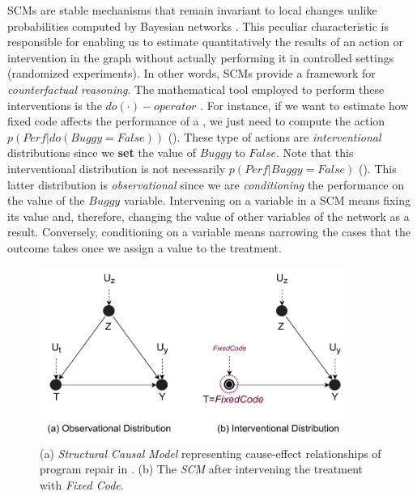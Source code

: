 SCMs are stable mechanisms that remain invariant to local changes unlike probabilities computed by Bayesian networks \citep{Pearl2016Causality}. This peculiar characteristic is responsible for enabling us to estimate quantitatively the results of an action or intervention in the graph without actually performing it in controlled settings (\ie randomized experiments). In other words, SCMs provide a framework for \textit{counterfactual reasoning}. The mathematical tool employed to perform these interventions is the $do(\cdot)-operator$ \citep{Pearl2009Causality}. For instance, if we want to estimate how fixed code affects the performance of a \nlm, we just need to compute the action $p(Perf|do(Buggy=False))$ (). These type of actions are \textit{interventional} distributions since we \textbf{set} the value of $Buggy$ to $False$. Note that this interventional distribution is not necessarily $p(Perf|Buggy=False)$ (). This latter distribution is \textit{observational} since we are \textit{conditioning} the performance on the value of the $Buggy$ variable. Intervening on a variable in a SCM means fixing its value and, therefore, changing the value of other variables of the network as a result. Conversely, conditioning on a variable means narrowing the cases that the outcome takes once we assign a value to the treatment.   

\begin{figure}[h]
		\centering
		\includegraphics[width=0.9\textwidth]{graphics/preliminaries/fig_1_causalnet.pdf}
		\caption{(a) \textit{Structural Causal Model} representing cause-effect relationships of program repair in \nlms. (b) The \textit{SCM} after intervening the treatment with \textit{Fixed Code}.}
        \label{fig:scm}
\end{figure}

